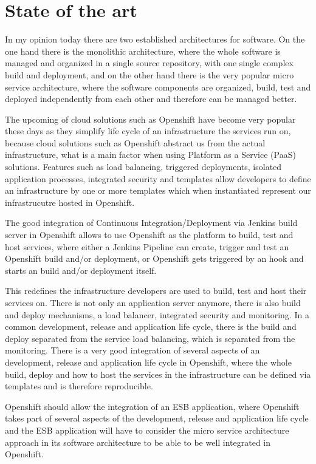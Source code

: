 \section{State of the art}
\label{sec:state-of-the-art}
In my opinion today there are two established architectures for software. On the one hand there is the monolithic architecture, where the whole software is managed and organized in a single source repository, with one single complex build and deployment, and on the other hand there is the very popular micro service architecture, where the software components are organized, build, test and deployed independently from each other and therefore can be managed better.

The upcoming of cloud solutions such as Openshift have become very popular these days as they simplify life cycle of an infrastructure the services run on, because cloud solutions such as Openshift abstract us from the actual infrastructure, what is a main factor when using Platform as a Service (PaaS) solutions. Features such as load balancing, triggered deployments, isolated application processes, integrated security and templates allow developers to define an infrastructure by one or more templates which when instantiated represent our infrastrucutre hosted in Openshift.

The good integration of Continuous Integration/Deployment via Jenkins build server in Openshift allows to use Openshift as the platform to build, test and host services, where either a Jenkins Pipeline can create, trigger and test an Openshift build and/or deployment, or Openshift gets triggered by an hook and starts an build and/or deployment itself.

This redefines the infrastructure developers are used to build, test and host their services on. There is not only an application server anymore, there is also build and deploy mechanisms, a load balancer, integrated security and monitoring. In a common development, release and application life cycle, there is the build and deploy separated from the service load balancing, which is separated from the monitoring. There is a very good integration of several aspects of an development, release and application life cycle in Openshift, where the whole build, deploy and how to host the services in the infrastructure can be defined via templates and is therefore reproducible.

Openshift should allow the integration of an ESB application, where Openshift takes part of several aspects of the development, release and application life cycle and the ESB application will have to consider the micro service architecture approach in its software architecture to be able to be well integrated in Openshift.

